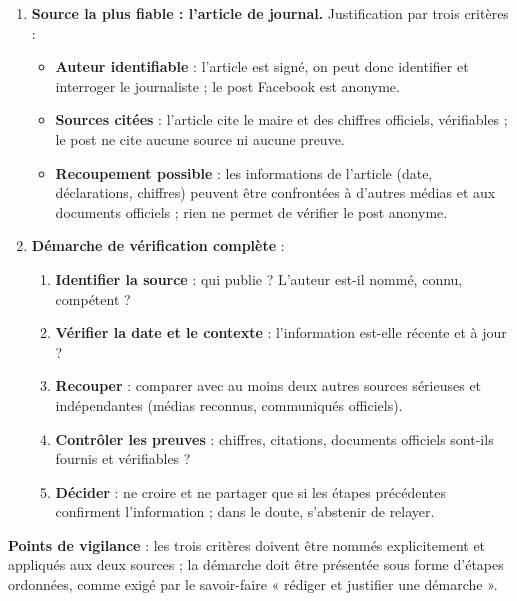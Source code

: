 \documentclass[11pt]{article}
\begin{document}
\begin{corrige}
\begin{enumerate}
\item \textbf{Source la plus fiable : l'article de journal.} Justification par trois critères :
\begin{itemize}
\item \textbf{Auteur identifiable} : l'article est signé, on peut donc identifier et interroger le journaliste ; le post Facebook est anonyme.
\item \textbf{Sources citées} : l'article cite le maire et des chiffres officiels, vérifiables ; le post ne cite aucune source ni aucune preuve.
\item \textbf{Recoupement possible} : les informations de l'article (date, déclarations, chiffres) peuvent être confrontées à d'autres médias et aux documents officiels ; rien ne permet de vérifier le post anonyme.
\end{itemize}
\item \textbf{Démarche de vérification complète} :
\begin{enumerate}
\item \textbf{Identifier la source} : qui publie ? L'auteur est-il nommé, connu, compétent ?
\item \textbf{Vérifier la date et le contexte} : l'information est-elle récente et à jour ?
\item \textbf{Recouper} : comparer avec au moins deux autres sources sérieuses et indépendantes (médias reconnus, communiqués officiels).
\item \textbf{Contrôler les preuves} : chiffres, citations, documents officiels sont-ils fournis et vérifiables ?
\item \textbf{Décider} : ne croire et ne partager que si les étapes précédentes confirment l'information ; dans le doute, s'abstenir de relayer.
\end{enumerate}
\end{enumerate}
\textbf{Points de vigilance} : les trois critères doivent être nommés explicitement et appliqués aux deux sources ; la démarche doit être présentée sous forme d'étapes ordonnées, comme exigé par le savoir-faire « rédiger et justifier une démarche ».
\end{corrige}
\end{document}

